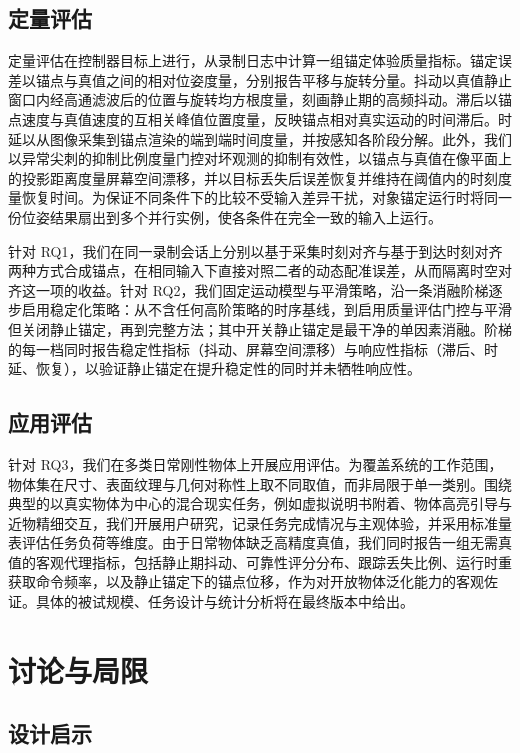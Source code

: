 \documentclass[review]{vgtc}
\begin{document}
\subsection{定量评估}


定量评估在控制器目标上进行，从录制日志中计算一组锚定体验质量指标。锚定误差以锚点与真值之间的相对位姿度量，分别报告平移与旋转分量。抖动以真值静止窗口内经高通滤波后的位置与旋转均方根度量，刻画静止期的高频抖动。滞后以锚点速度与真值速度的互相关峰值位置度量，反映锚点相对真实运动的时间滞后。时延以从图像采集到锚点渲染的端到端时间度量，并按感知各阶段分解。此外，我们以异常尖刺的抑制比例度量门控对坏观测的抑制有效性，以锚点与真值在像平面上的投影距离度量屏幕空间漂移，并以目标丢失后误差恢复并维持在阈值内的时刻度量恢复时间。为保证不同条件下的比较不受输入差异干扰，对象锚定运行时将同一份位姿结果扇出到多个并行实例，使各条件在完全一致的输入上运行。

针对 RQ1，我们在同一录制会话上分别以基于采集时刻对齐与基于到达时刻对齐两种方式合成锚点，在相同输入下直接对照二者的动态配准误差，从而隔离时空对齐这一项的收益。针对 RQ2，我们固定运动模型与平滑策略，沿一条消融阶梯逐步启用稳定化策略：从不含任何高阶策略的时序基线，到启用质量评估门控与平滑但关闭静止锚定，再到完整方法；其中开关静止锚定是最干净的单因素消融。阶梯的每一档同时报告稳定性指标（抖动、屏幕空间漂移）与响应性指标（滞后、时延、恢复），以验证静止锚定在提升稳定性的同时并未牺牲响应性。

\subsection{应用评估}


针对 RQ3，我们在多类日常刚性物体上开展应用评估。为覆盖系统的工作范围，物体集在尺寸、表面纹理与几何对称性上取不同取值，而非局限于单一类别。围绕典型的以真实物体为中心的混合现实任务，例如虚拟说明书附着、物体高亮引导与近物精细交互，我们开展用户研究，记录任务完成情况与主观体验，并采用标准量表评估任务负荷等维度。由于日常物体缺乏高精度真值，我们同时报告一组无需真值的客观代理指标，包括静止期抖动、可靠性评分分布、跟踪丢失比例、运行时重获取命令频率，以及静止锚定下的锚点位移，作为对开放物体泛化能力的客观佐证。具体的被试规模、任务设计与统计分析将在最终版本中给出。

\section{讨论与局限}\label{sec:discussion}


\subsection{设计启示}
\end{document}
